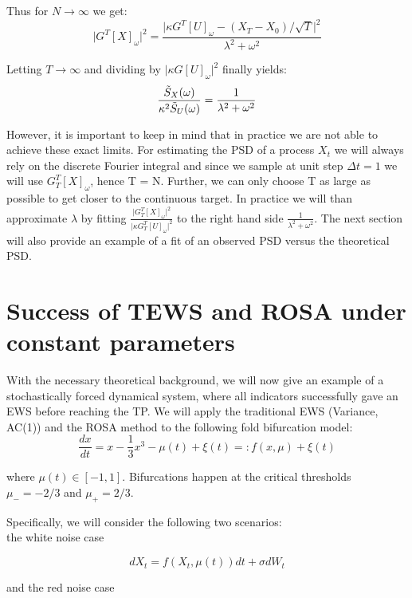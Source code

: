 \documentclass[%
thesis=student,%
coverpage=false,%
titlepage=false,%
headmarks=true, %
english,%
font=libertine, %
math=newpxtx, %
BCOR=5mm,%
coverBCOR=11mm%
]{tumbook}
\begin{document}
Thus for $N \rightarrow \infty$ we get:
\[
    \lvert G^{T}[X]_{\omega} \rvert^2 = \frac{\lvert\kappa G^{T}[U]_{\omega} - (X_{T}-X_{0})/\sqrt{T}\rvert ^2}{\lambda^2 + \omega^2}
\]

Letting $T \rightarrow \infty$ and dividing by $\lvert\kappa G[U]_{\omega}\rvert^2$ finally yields:
\[
    \frac{\Tilde{S}_{X}(\omega)}{\kappa^2\Tilde{S}_{U}(\omega)} = \frac{1}{\lambda^2 + \omega^2}
\]

However, it is important to keep in mind that in practice we are not able to achieve these exact limits. For estimating the PSD of a process $X_{t}$ we will always rely on the discrete Fourier integral and since we sample at unit step $\Delta t = 1$ we will use $G_{T}^{T}[X]_{\omega}$, hence T = N. Further, we can only choose T as large as possible to get closer to the continuous target. In practice we will than approximate $\lambda$ by fitting $\frac{\lvert G_{T}^{T}[X]_{\omega} \rvert ^2}{\lvert \kappa G_{T}^{T}[U]_{\omega} \rvert ^2}$ to the right hand side $\frac{1}{\lambda^2 + \omega^2}$. The next section will also provide an example of a fit of an observed PSD versus the theoretical PSD.





\chapter{Success of TEWS and ROSA under constant parameters}

With the necessary theoretical background, we will now give an example of a stochastically forced dynamical system, where all indicators successfully gave an EWS before reaching the TP.
We will apply the traditional EWS (Variance, AC(1)) and the ROSA method to the following fold bifurcation model: 
        \[
            \frac{dx}{dt} = x - \frac{1}{3}x^3 - \mu(t) + \xi(t) =: f(x,\mu) + \xi(t)
        \]
        
where $\mu(t) \in [-1,1]$. Bifurcations happen at the critical thresholds $\mu_{-} = -2/3$ and $\mu_{+} = 2/3$.

Specifically, we will consider the following two scenarios: \\
    the white noise case
    
    \begin{equation}  
    dX_{t} = f(X_{t},\mu(t))dt + \sigma dW_{t}
    \label{successful application white noise}
    \end{equation}


and the red noise case
\end{document}
